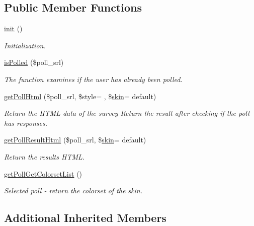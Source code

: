 \subsection*{Public Member Functions}
\begin{DoxyCompactItemize}
\item 
\hyperlink{classpollModel_a201866e44c1ba55917c57b15ae37f984}{init} ()
\begin{DoxyCompactList}\small\item\em Initialization. \end{DoxyCompactList}\item 
\hyperlink{classpollModel_a2364a327ffba2641db0722cdcf0c40d7}{is\+Polled} (\$poll\+\_\+srl)
\begin{DoxyCompactList}\small\item\em The function examines if the user has already been polled. \end{DoxyCompactList}\item 
\hyperlink{classpollModel_adf54e16d01ff98966cfc330c667b9898}{get\+Poll\+Html} (\$poll\+\_\+srl, \$style= \textquotesingle{}\textquotesingle{}, \$\hyperlink{ko_8install_8php_ab0f2b49fdb57754496b34f6b880cdeaf}{skin}= \textquotesingle{}default\textquotesingle{})
\begin{DoxyCompactList}\small\item\em Return the H\+T\+M\+L data of the survey Return the result after checking if the poll has responses. \end{DoxyCompactList}\item 
\hyperlink{classpollModel_a2353dcbc141fa99d8fe05b223f738372}{get\+Poll\+Result\+Html} (\$poll\+\_\+srl, \$\hyperlink{ko_8install_8php_ab0f2b49fdb57754496b34f6b880cdeaf}{skin}= \textquotesingle{}default\textquotesingle{})
\begin{DoxyCompactList}\small\item\em Return the result\textquotesingle{}s H\+T\+M\+L. \end{DoxyCompactList}\item 
\hyperlink{classpollModel_a350de71f668751cd553fc60aca3fa72c}{get\+Poll\+Get\+Colorset\+List} ()
\begin{DoxyCompactList}\small\item\em Selected poll -\/ return the colorset of the skin. \end{DoxyCompactList}\end{DoxyCompactItemize}
\subsection*{Additional Inherited Members}


